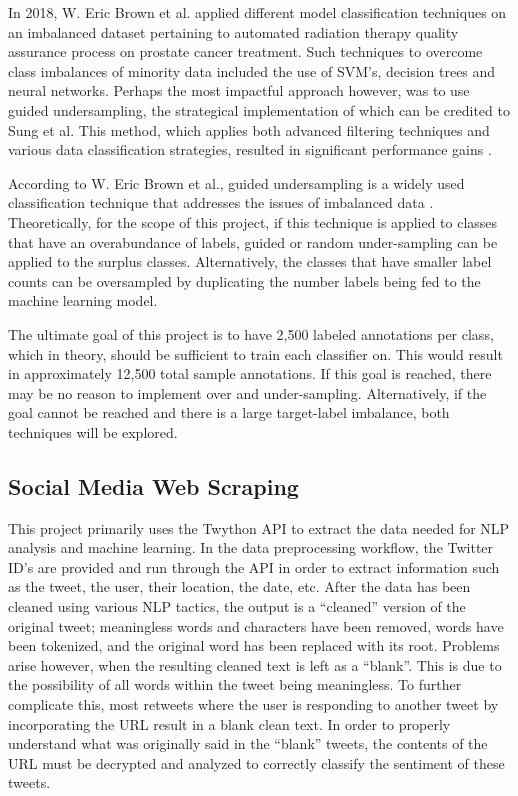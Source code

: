 \documentclass[12pt]{article}
\begin{document}
In 2018, W. Eric Brown et al. applied different model classification techniques on an imbalanced dataset pertaining to automated radiation therapy quality assurance process on prostate cancer treatment. Such techniques to overcome class imbalances of minority data included the use of SVM’s, decision trees and neural networks.  Perhaps the most impactful approach however, was to use guided undersampling, the strategical implementation of which can be credited to Sung et al.  This method, which applies both advanced filtering techniques and various data classification strategies, resulted in significant performance gains \cite{brown-etall-2018}.

According to W. Eric Brown et al., guided undersampling is a widely used classification technique that addresses the issues of imbalanced data \cite{brown-etall-2018}. Theoretically, for the scope of this project, if this technique is applied to classes that have an overabundance of labels, guided or random under-sampling can be applied to the surplus classes.  Alternatively, the classes that have smaller label counts can be oversampled by duplicating the number labels being fed to the machine learning model.  


The ultimate goal of this project is to have 2,500 labeled annotations per class, which in theory, should be sufficient to train each classifier on. This would result in approximately 12,500 total sample annotations.  If this goal is reached, there may be no reason to implement over and under-sampling.  Alternatively, if the goal cannot be reached and there is a large target-label imbalance, both techniques will be explored.

\subsection{Social Media Web Scraping}

This project primarily uses the Twython API to extract the data needed for NLP analysis and machine learning.  In the data preprocessing workflow, the Twitter ID’s are provided and run through the API in order to extract information such as the tweet, the user, their location, the date, etc. After the data has been cleaned using various NLP tactics, the output is a “cleaned” version of the original tweet; meaningless words and characters have been removed, words have been tokenized, and the original word has been replaced with its root.  Problems arise however, when the resulting cleaned text is left as a “blank”.  This is due to the possibility of all words within the tweet being meaningless.  To further complicate this, most retweets where the user is responding to another tweet by incorporating the URL result in a blank clean text.  In order to properly understand what was originally said in the “blank” tweets, the contents of the URL must be decrypted and analyzed to correctly classify the sentiment of these tweets. 
\end{document}
